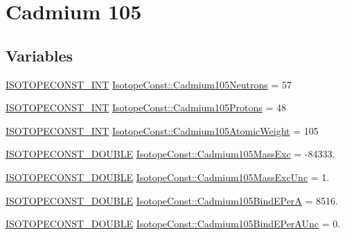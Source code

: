 \hypertarget{group___isotope_const-_cadmium-_cd105}{}\section{Cadmium 105}
\label{group___isotope_const-_cadmium-_cd105}
\subsection*{Variables}
\begin{DoxyCompactItemize}
\item 
\mbox{\hyperlink{group___isotope_const-_macros_ga5f18360b3e99483a35c32d789e62621c}{I\+S\+O\+T\+O\+P\+E\+C\+O\+N\+S\+T\+\_\+\+I\+NT}} \mbox{\hyperlink{group___isotope_const-_cadmium-_cd105_ga4914202b61610b6d650f75f56ce5db26}{Isotope\+Const\+::\+Cadmium105\+Neutrons}} = 57
\item 
\mbox{\hyperlink{group___isotope_const-_macros_ga5f18360b3e99483a35c32d789e62621c}{I\+S\+O\+T\+O\+P\+E\+C\+O\+N\+S\+T\+\_\+\+I\+NT}} \mbox{\hyperlink{group___isotope_const-_cadmium-_cd105_ga518a853d860a266976d85a059fffcebc}{Isotope\+Const\+::\+Cadmium105\+Protons}} = 48
\item 
\mbox{\hyperlink{group___isotope_const-_macros_ga5f18360b3e99483a35c32d789e62621c}{I\+S\+O\+T\+O\+P\+E\+C\+O\+N\+S\+T\+\_\+\+I\+NT}} \mbox{\hyperlink{group___isotope_const-_cadmium-_cd105_gab34d700c1c3bba517e62dfaedf0d5acf}{Isotope\+Const\+::\+Cadmium105\+Atomic\+Weight}} = 105
\item 
\mbox{\hyperlink{group___isotope_const-_macros_ga8f45a7272ce02c0b4c65c44636ed719a}{I\+S\+O\+T\+O\+P\+E\+C\+O\+N\+S\+T\+\_\+\+D\+O\+U\+B\+LE}} \mbox{\hyperlink{group___isotope_const-_cadmium-_cd105_ga62ea1a18afe573de1e575154fa9ca674}{Isotope\+Const\+::\+Cadmium105\+Mass\+Exc}} = -\/84333.
\item 
\mbox{\hyperlink{group___isotope_const-_macros_ga8f45a7272ce02c0b4c65c44636ed719a}{I\+S\+O\+T\+O\+P\+E\+C\+O\+N\+S\+T\+\_\+\+D\+O\+U\+B\+LE}} \mbox{\hyperlink{group___isotope_const-_cadmium-_cd105_gadd0b17691b6ca91836f5d8ab682e27ef}{Isotope\+Const\+::\+Cadmium105\+Mass\+Exc\+Unc}} = 1.
\item 
\mbox{\hyperlink{group___isotope_const-_macros_ga8f45a7272ce02c0b4c65c44636ed719a}{I\+S\+O\+T\+O\+P\+E\+C\+O\+N\+S\+T\+\_\+\+D\+O\+U\+B\+LE}} \mbox{\hyperlink{group___isotope_const-_cadmium-_cd105_ga427039059cbe150b3f432964291c9cfa}{Isotope\+Const\+::\+Cadmium105\+Bind\+E\+PerA}} = 8516.
\item 
\mbox{\hyperlink{group___isotope_const-_macros_ga8f45a7272ce02c0b4c65c44636ed719a}{I\+S\+O\+T\+O\+P\+E\+C\+O\+N\+S\+T\+\_\+\+D\+O\+U\+B\+LE}} \mbox{\hyperlink{group___isotope_const-_cadmium-_cd105_ga2fbfb16c8b57d48a6b29e56af45f1ef4}{Isotope\+Const\+::\+Cadmium105\+Bind\+E\+Per\+A\+Unc}} = 0.

\end{DoxyCompactItemize}
